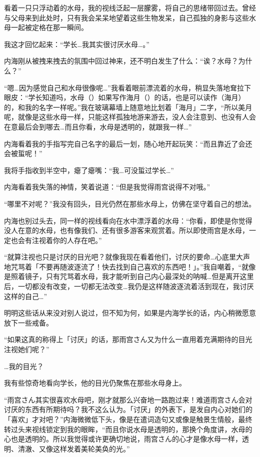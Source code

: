 看着一只只浮动着的水母，我的视线泛起一层朦雾，将自己的思绪带回过去。曾经与父母来到此处时，只有我会呆呆地望着这些生物发呆，自己孤独的身影与这些水母一起被定格在那一瞬间。

我这才回忆起来：“学长…我其实很讨厌水母…。”

内海刚从被拽来拽去的氛围中回过神来，还不明白发生了什么：“诶？水母？为什么？”

“嗯…因为感觉自己和水母很像呢…”我看着眼前漂流着的水母，稍显失落地耷拉下眼皮：“学长知道吗，水母（）如果写作海月（）的话，也是可以读作（海月）的，和我的名字一样呢。”我在玻璃幕墙上随意地比划着「海月」二字，“所以美月呢，就像是这些水母一样，只能这样孤独地游来游去，没人会注意到、也没有人会在意最后会到哪去…而且你看，水母是透明的，就跟我一样…”

内海看着我的手指写完自己名字的最后一划，随心地开起玩笑：“而且靠近了会还会被蜇呢！”

我将手指收到半空中，瘪了瘪嘴：“我…可没蜇过学长…”

内海看着我失落的神情，笑着说道：“但是我觉得雨宫说得不对哦。”

“哪里不对呢？”我没有回头，目光仍然在那些水母上，仿佛在坚守着自己的想法。

内海也别过头去，同一样的视线看向在水中漂浮着的水母：“你看，即使是你觉得没人在意的水母，也有像我们、还有很多游客来观赏着。所以即使雨宫是水母，一定也会有注视着你的人存在吧。”

“就算注视也只是讨厌的目光吧？就像我现在看着他们，讨厌的要命…心底里大声地咒骂着「不要再随波逐流了！快去找到自己喜欢的东西吧！」。”我自嘲着，“就像是照着镜子，只有咒骂着水母，我才能听到自己内心最深处的呐喊…但是离开这里后，一切都没有改变，一切都无法改变…我仍是这样随波逐流着活到现在，我讨厌这样的自己…”

明明这些话从来没对别人说过，但不知为何，如果是内海学长的话，内心稍微愿意放下一些戒备。

“如果这真的称得上「讨厌」的话，那雨宫さん又为什么一直用着充满期待的目光注视她们呢？”

…我的目光？

我有些惊奇地看向学长，他的目光仍聚焦在那些水母身上。

“雨宫さん其实很喜欢水母吧，刚才就那么兴奋地一路跑过来！难道雨宫さん会对讨厌的东西有所期待吗？我不这么认为。「讨厌」的外表下，是发自内心对她们的「喜欢」才对吧？”内海微微低下头，像是在遣词造句又或像是触景生情般，最终转过头来视线锁定到我的眼眸，“而且你说水母是透明的，那换个角度讲，水母的心也是透明的。所以我觉得或许更确切地说，雨宫さん的心才是像水母一样，透明、清澈、又像这样发着美轮美奂的光。”

